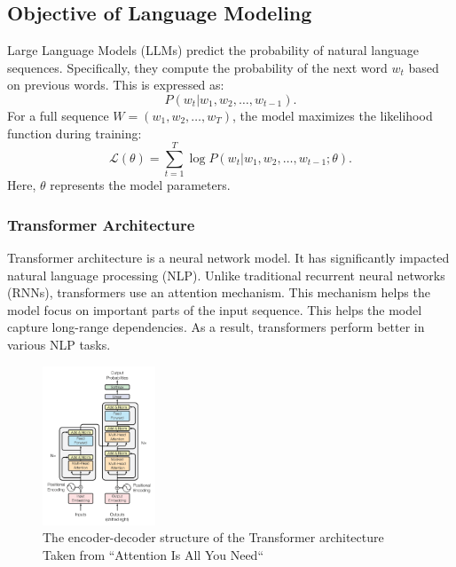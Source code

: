 \documentclass[fleqn,10pt]{SelfArx} %
\begin{document}







\subsection{Objective of Language Modeling}

Large Language Models (LLMs) predict the probability of natural language sequences. Specifically, they compute the probability of the next word \(w_t\) based on previous words. This is expressed as:
\[
P(w_t | w_1, w_2, \ldots, w_{t-1}).
\]
For a full sequence \(W = (w_1, w_2, \ldots, w_T)\), the model maximizes the likelihood function during training:
\[
\mathcal{L}(\theta) = \sum_{t=1}^T \log P(w_t | w_1, w_2, \ldots, w_{t-1}; \theta).
\]
Here, \(\theta\) represents the model parameters.

\subsubsection{Transformer Architecture}

Transformer architecture is a neural network model. It has significantly impacted natural language processing (NLP). Unlike traditional recurrent neural networks (RNNs), transformers use an attention mechanism. This mechanism helps the model focus on important parts of the input sequence. This helps the model capture long-range dependencies. As a result, transformers perform better in various NLP tasks. 

\begin{figure}[ht]\centering
	\includegraphics[width=0.3\textwidth]{Figures/attention.png}
	\caption{The  encoder-decoder structure of the Transformer architecture
	Taken from “Attention Is All You Need“\cite{vaswani2023attentionneed}}
	\label{fig:tran}
\end{figure}
\end{document}
